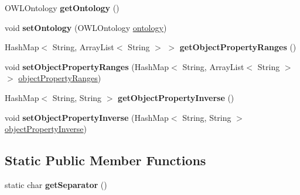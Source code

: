 \begin{DoxyCompactItemize}
\item 
\hypertarget{class_ontology_1_1_object_property_a10e0f7c4bb0d6143e73ad04d9af4b812}{
OWLOntology {\bfseries getOntology} ()}
\label{class_ontology_1_1_object_property_a10e0f7c4bb0d6143e73ad04d9af4b812}

\item 
\hypertarget{class_ontology_1_1_object_property_ab2d33c749bee1769bed4e8f17600ecaa}{
void {\bfseries setOntology} (OWLOntology \hyperlink{class_ontology_1_1_object_property_a29d4ef0f8ba3a809b35cc36b6863f122}{ontology})}
\label{class_ontology_1_1_object_property_ab2d33c749bee1769bed4e8f17600ecaa}

\item 
\hypertarget{class_ontology_1_1_object_property_a837c1581c09bfb4d570299c4efd18274}{
HashMap$<$ String, ArrayList$<$ String $>$ $>$ {\bfseries getObjectPropertyRanges} ()}
\label{class_ontology_1_1_object_property_a837c1581c09bfb4d570299c4efd18274}

\item 
\hypertarget{class_ontology_1_1_object_property_a12b5bd5f4c3b4f5c7e1351dfe22f9943}{
void {\bfseries setObjectPropertyRanges} (HashMap$<$ String, ArrayList$<$ String $>$$>$ \hyperlink{class_ontology_1_1_object_property_a7e8b47c59b8d708d2ab5a02058a795f1}{objectPropertyRanges})}
\label{class_ontology_1_1_object_property_a12b5bd5f4c3b4f5c7e1351dfe22f9943}

\item 
\hypertarget{class_ontology_1_1_object_property_ae457b9895d2c5cdc31951e9c560ff8b1}{
HashMap$<$ String, String $>$ {\bfseries getObjectPropertyInverse} ()}
\label{class_ontology_1_1_object_property_ae457b9895d2c5cdc31951e9c560ff8b1}

\item 
\hypertarget{class_ontology_1_1_object_property_a9cbadf04fc676d19227968f6c6c535d3}{
void {\bfseries setObjectPropertyInverse} (HashMap$<$ String, String $>$ \hyperlink{class_ontology_1_1_object_property_a363cd9e611554fbad7c3efbc48621715}{objectPropertyInverse})}
\label{class_ontology_1_1_object_property_a9cbadf04fc676d19227968f6c6c535d3}

\end{DoxyCompactItemize}
\subsection*{Static Public Member Functions}
\begin{DoxyCompactItemize}
\item 
\hypertarget{class_ontology_1_1_object_property_af0df7386e5b60907bd8ac938541dc0ad}{
static char {\bfseries getSeparator} ()}
\label{class_ontology_1_1_object_property_af0df7386e5b60907bd8ac938541dc0ad}

\end{DoxyCompactItemize}
